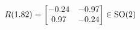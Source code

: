 \documentclass[preview]{standalone}
\begin{document}
\begin{align*}
\special{dvisvgm:raw <g id='unique000'>}R(1.82) = \begin{bmatrix} -0.24 & -0.97 \\ 0.97 & -0.24 \end{bmatrix} \in \text{SO}(2)\special{dvisvgm:raw </g>}
\end{align*}
\end{document}
